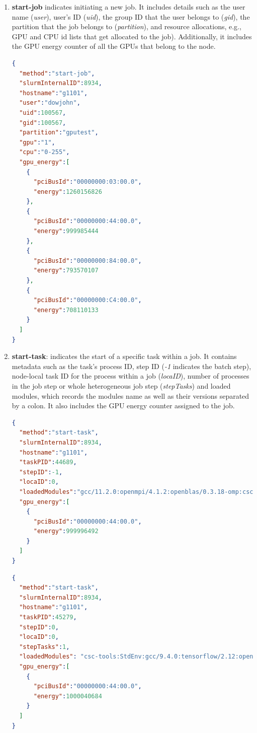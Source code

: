 \begin{enumerate}
    \item \textbf{start-job} indicates initiating a new job. It includes details such as the user name (\textit{user}), user's ID (\textit{uid}), the group ID that the user belongs to (\textit{gid}), the partition that the job belongs to (\textit{partition}), and resource allocations, e.g., GPU and CPU id lists that get allocated to the job). Additionally, it includes the GPU energy counter of all the GPUs that belong to the node.

\clearpage

\begin{lstlisting}[language=JSON]
{
  "method":"start-job",
  "slurmInternalID":8934,
  "hostname":"g1101",
  "user":"dowjohn",
  "uid":100567,
  "gid":100567,
  "partition":"gputest",
  "gpu":"1",
  "cpu":"0-255",
  "gpu_energy":[
    {
      "pciBusId":"00000000:03:00.0",
      "energy":1260156826
    },
    {
      "pciBusId":"00000000:44:00.0",
      "energy":999985444
    },
    {
      "pciBusId":"00000000:84:00.0",
      "energy":793570107
    },
    {
      "pciBusId":"00000000:C4:00.0",
      "energy":708110133
    }
  ]
}
\end{lstlisting}

    \item \textbf{start-task}: indicates the start of a specific task within a job. It contains metadata such as the task's process ID, step ID (\textit{-1} indicates the batch step), node-local task ID for the process within a job (\textit{locaID}), number of processes in the job step or whole heterogeneous job step (\textit{stepTasks}) and loaded modules, which records the modules name as well as their versions separated by a colon. It also includes the GPU energy counter assigned to the job.

\clearpage

\begin{lstlisting}[language=JSON]
{
  "method":"start-task",
  "slurmInternalID":8934,
  "hostname":"g1101",
  "taskPID":44689,
  "stepID":-1,
  "locaID":0,
  "loadedModules":"gcc/11.2.0:openmpi/4.1.2:openblas/0.3.18-omp:csc-tools:StdEnv",
  "gpu_energy":[
    {
      "pciBusId":"00000000:44:00.0",
      "energy":999996492
    }
  ]
}
\end{lstlisting}

\begin{lstlisting}[language=JSON]
{
  "method":"start-task",
  "slurmInternalID":8934,
  "hostname":"g1101",
  "taskPID":45279,
  "stepID":0,
  "locaID":0,
  "stepTasks":1,
  "loadedModules": "csc-tools:StdEnv:gcc/9.4.0:tensorflow/2.12:openblas/0.3.18-omp:openmpi/4.1.2:cuda/11.5.0",
  "gpu_energy":[
    {
      "pciBusId":"00000000:44:00.0",
      "energy":1000040684
    }
  ]
}
\end{lstlisting}


\end{enumerate}
